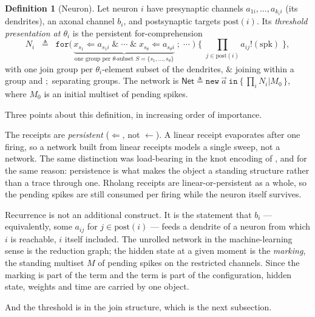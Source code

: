 \documentclass[11pt,a4paper]{article}
\theoremstyle{plain}
\theoremstyle{definition}
\newtheorem{definition}[theorem]{Definition}
\theoremstyle{remark}
\newcommand{\sepc}{\mathbin{\big|}}
\begin{document}
\begin{definition}[Neuron]
\label{def:neuron}
Let neuron $i$ have presynaptic channels $a_{1i}, \ldots, a_{k_i i}$ (its dendrites), an axonal
channel $b_i$, and postsynaptic targets $\mathrm{post}(i)$. Its \emph{threshold presentation at
$\theta_i$} is the persistent for-comprehension
\[
N_i \;\;\triangleq\;\;
\texttt{for}\big(\,
\underbrace{x_{s_1} \Leftarrow a_{s_1 i} \;\&\; \cdots \;\&\; x_{s_{\theta}} \Leftarrow a_{s_\theta i}}_{\text{one group per }\theta\text{-subset } S = \{s_1,\ldots,s_\theta\}}
\;;\; \cdots \;\big)\;\big\{\;\textstyle\prod_{j \in \mathrm{post}(i)} a_{ij}!(\mathrm{spk})\;\big\},
\]
with one join group per $\theta_i$-element subset of the dendrites, $\&$ joining within a group and
$;$ separating groups. The network is
$\mathsf{Net} \triangleq \texttt{new}\ \vec{a}\ \texttt{in}\ \{\, \prod_i N_i \sepc M_0 \,\}$, where
$M_0$ is an initial multiset of pending spikes.
\end{definition}

Three points about this definition, in increasing order of importance.

The receipts are \emph{persistent} ($\Leftarrow$, not $\leftarrow$). A linear receipt evaporates
after one firing, so a network built from linear receipts models a single sweep, not a network. The
same distinction was load-bearing in the knot encoding of \cite{knots}, and for the same reason:
persistence is what makes the object a standing structure rather than a trace through one.
Rholang receipts are linear-or-persistent as a whole, so the pending spikes are still consumed per
firing while the neuron itself survives.

Recurrence is not an additional construct. It is the statement that $b_i$ --- equivalently, some
$a_{ij}$ for $j \in \mathrm{post}(i)$ --- feeds a dendrite of a neuron from which $i$ is reachable,
$i$ itself included. The unrolled network in the machine-learning sense is the reduction graph; the
hidden state at a given moment is the \emph{marking}, the standing multiset $M$ of pending spikes on
the restricted channels. Since the marking is part of the term and the term is part of the
configuration, hidden state, weights and time are carried by one object.

And the threshold is in the join structure, which is the next subsection.
\end{document}

